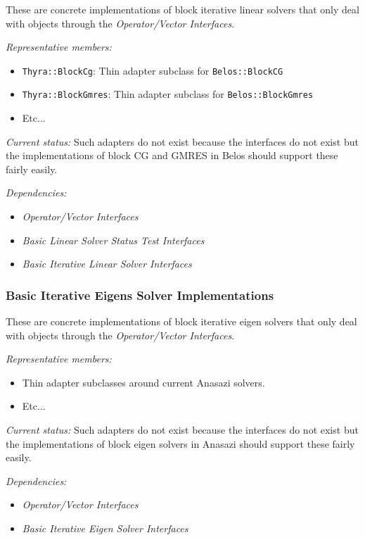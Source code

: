 \documentclass[pdf,ps2pdf,11pt]{SANDreport}
\begin{document}
These are concrete implementations of block iterative linear solvers that only
deal with objects through the {}\textit{Operator/Vector Interfaces}.

{}\textit{Representative members:}
\begin{itemize}
%
{}\item \texttt{Thyra::BlockCg}: Thin adapter subclass for
{}\texttt{Belos::BlockCG}
%
{}\item \texttt{Thyra::BlockGmres}: Thin adapter subclass for
{}\texttt{Belos::BlockGmres}
%
{}\item Etc...
%
\end{itemize}

{}\textit{Current status:} Such adapters do not exist because the interfaces
do not exist but the implementations of block CG and GMRES in Belos should
support these fairly easily.

{}\textit{Dependencies:}
\begin{itemize}
\item {}\textit{Operator/Vector Interfaces}
\item {}\textit{Basic Linear Solver Status Test Interfaces}
\item {}\textit{Basic Iterative Linear Solver Interfaces}
\end{itemize}

%
\subsubsection{Basic Iterative Eigens Solver Implementations}
%

These are concrete implementations of block iterative eigen solvers that only
deal with objects through the {}\textit{Operator/Vector Interfaces}.

{}\textit{Representative members:}
\begin{itemize}
%
{}\item Thin adapter subclasses around current Anasazi solvers.
%
{}\item Etc...
%
\end{itemize}

{}\textit{Current status:} Such adapters do not exist because the interfaces
do not exist but the implementations of block eigen solvers in Anasazi should
support these fairly easily.

{}\textit{Dependencies:}
\begin{itemize}
\item {}\textit{Operator/Vector Interfaces}
\item {}\textit{Basic Iterative Eigen Solver Interfaces}
\end{itemize}
\end{document}
